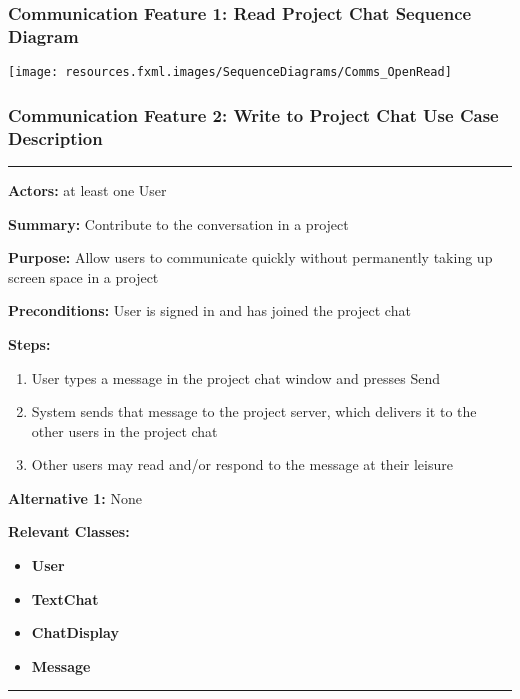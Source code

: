 \documentclass[twoside,letterpaper]{article}
\begin{document}
\subsubsection[Communication Feature 1: Read Project Chat Sequence Diagram]{\rmfamily\bfseries\color{black}
	Communication Feature 1: Read Project Chat Sequence Diagram}
\hypertarget{RefHeading22059017292}{}

\bigskip

\texttt{[image: resources.fxml.images/SequenceDiagrams/Comms\_OpenRead]}

\newpage

\subsubsection[Communication Feature 2: Write to Project Chat Use Case Description]{\rmfamily\bfseries\color{black}
	Communication Feature 2: Write to Project Chat Use Case Description}
\hypertarget{RefHeading22059017292}{}

\vspace{2pt}
\hrule
\vspace{8pt}
\textbf{Actors:} at least one User \newline

\noindent\textbf{Summary:} Contribute to the conversation in a project  \newline

\noindent\textbf{Purpose:} Allow users to communicate quickly without permanently taking up screen space in a project \newline

\noindent\textbf{Preconditions:} User is signed in and has joined the project chat \newline

\noindent\textbf{Steps:} \begin{enumerate}
	\item User types a message in the project chat window and presses Send
	\item System sends that message to the project server, which delivers it to the other users in the project chat
	\item Other users may read and/or respond to the message at their leisure
\end{enumerate}
\noindent\textbf{Alternative 1:} None \newline


\noindent\textbf{Relevant Classes:}
\begin{itemize}
	\item \textbf{User}
	\item \textbf{TextChat}
	\item \textbf{ChatDisplay}
	\item \textbf{Message}
\end{itemize}
\hrule
\newpage
\end{document}
